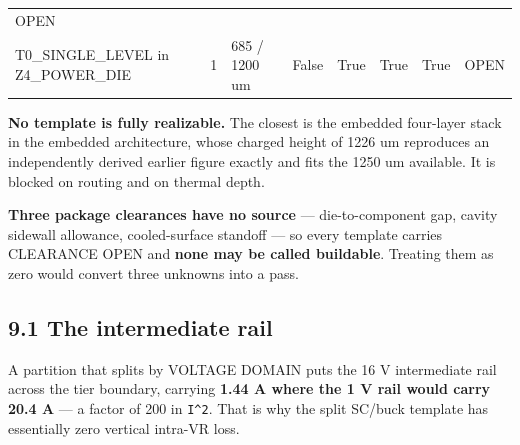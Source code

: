 \documentclass[10pt,]{article}
\begin{document}
\begin{longtable}[]{@{}llllllll@{}}
\begin{minipage}[t]{0.10\columnwidth}
OPEN\strut
\end{minipage}\tabularnewline
\begin{minipage}[t]{0.10\columnwidth}\raggedright
T0\_SINGLE\_LEVEL in Z4\_POWER\_DIE\strut
\end{minipage} & \begin{minipage}[t]{0.10\columnwidth}\raggedright
1\strut
\end{minipage} & \begin{minipage}[t]{0.10\columnwidth}\raggedright
685 / 1200 um\strut
\end{minipage} & \begin{minipage}[t]{0.10\columnwidth}\raggedright
False\strut
\end{minipage} & \begin{minipage}[t]{0.10\columnwidth}\raggedright
True\strut
\end{minipage} & \begin{minipage}[t]{0.10\columnwidth}\raggedright
True\strut
\end{minipage} & \begin{minipage}[t]{0.10\columnwidth}\raggedright
True\strut
\end{minipage} & \begin{minipage}[t]{0.10\columnwidth}\raggedright
OPEN\strut
\end{minipage}\tabularnewline
\bottomrule
\end{longtable}

\textbf{No template is fully realizable.} The closest is the embedded
four-layer stack in the embedded architecture, whose charged height of
1226 um reproduces an independently derived earlier figure exactly and
fits the 1250 um available. It is blocked on routing and on thermal
depth.

\textbf{Three package clearances have no source} --- die-to-component
gap, cavity sidewall allowance, cooled-surface standoff --- so every
template carries CLEARANCE OPEN and \textbf{none may be called
buildable}. Treating them as zero would convert three unknowns into a
pass.

\hypertarget{the-intermediate-rail}{%
\subsection{9.1 The intermediate rail}\label{the-intermediate-rail}}

A partition that splits by VOLTAGE DOMAIN puts the 16 V intermediate
rail across the tier boundary, carrying \textbf{1.44 A where the 1 V
rail would carry 20.4 A} --- a factor of 200 in \texttt{I\^{}2}. That is
why the split SC/buck template has essentially zero vertical intra-VR
loss.
\end{document}

